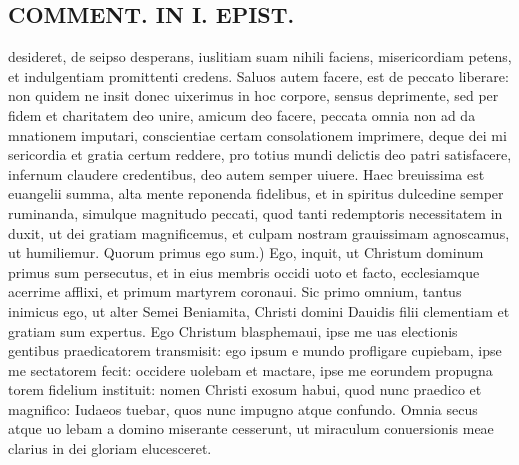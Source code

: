 \documentclass{article}
\begin{document}
\begin{pages}
\section*{COMMENT. IN I. EPIST. }
\marginpar{[ p.476 ]}\pstart desideret, de seipso desperans, iuslitiam suam nihili faciens, misericordiam petens, et indulgentiam promittenti credens. Saluos autem facere, est de peccato liberare: non quidem ne insit donec uixerimus in hoc corpore, sensus deprimente, sed per fidem et charitatem deo unire, amicum deo facere, peccata omnia non ad da mnationem imputari, conscientiae certam consolationem imprimere, deque dei mi sericordia et gratia certum reddere, pro totius mundi delictis deo patri satisfacere, infernum claudere credentibus, deo autem semper uiuere. Haec breuissima est euangelii summa, alta mente reponenda fidelibus, et in spiritus dulcedine semper ruminanda, simulque magnitudo peccati, quod tanti redemptoris necessitatem in duxit, ut dei gratiam magnificemus, et culpam nostram grauissimam agnoscamus, ut humiliemur. Quorum primus ego sum.) Ego, inquit, ut Christum dominum primus sum persecutus, et in eius membris occidi uoto et facto, ecclesiamque acerrime afflixi, et primum martyrem coronaui. Sic primo omnium, tantus inimicus ego, ut alter Semei Beniamita, Christi domini Dauidis filii clementiam et gratiam sum expertus. Ego Christum blasphemaui, ipse me uas electionis gentibus praedicatorem transmisit: ego ipsum e mundo profligare cupiebam, ipse me sectatorem fecit: occidere uolebam et mactare, ipse me eorundem propugna torem fidelium instituit: nomen Christi exosum habui, quod nunc praedico et magnifico: Iudaeos tuebar, quos nunc impugno atque confundo. Omnia secus atque uo lebam a domino miserante cesserunt, ut miraculum conuersionis meae clarius in dei gloriam elucesceret.  \pend
{}
{}

\end{pages}
\end{document}
